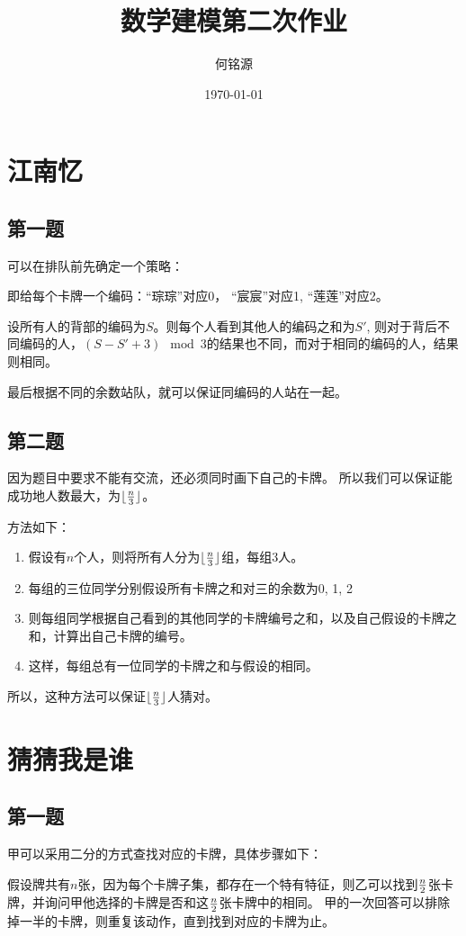 \documentclass{ctexart}
\author{何铭源}
\date{\today}
\title{数学建模第二次作业}
\begin{document}
\maketitle
\section{江南忆}
\subsection{第一题}
可以在排队前先确定一个策略：

即给每个卡牌一个编码：``琮琮''对应0， ``宸宸''对应1, ``莲莲''对应2。

设所有人的背部的编码为$S$。则每个人看到其他人的编码之和为$S'$, 则对于背后不同编码的人，$(S - S' + 3) \mod 3$的结果也不同，而对于相同的编码的人，结果则相同。

最后根据不同的余数站队，就可以保证同编码的人站在一起。
\subsection{第二题}
因为题目中要求不能有交流，还必须同时画下自己的卡牌。
所以我们可以保证能成功地人数最大，为$\lfloor {n \over 3} \rfloor$。

方法如下：
\begin{enumerate}
    \item 假设有$n$个人，则将所有人分为$\lfloor {n \over 3} \rfloor$组，每组3人。
    \item 每组的三位同学分别假设所有卡牌之和对三的余数为0, 1, 2
    \item 则每组同学根据自己看到的其他同学的卡牌编号之和，以及自己假设的卡牌之和，计算出自己卡牌的编号。
    \item 这样，每组总有一位同学的卡牌之和与假设的相同。
\end{enumerate}
所以，这种方法可以保证$\lfloor{ n \over 3} \rfloor$人猜对。
\section{猜猜我是谁}
\subsection{第一题}
甲可以采用二分的方式查找对应的卡牌，具体步骤如下：

假设牌共有$n$张，因为每个卡牌子集，都存在一个特有特征，则乙可以找到$n \over 2$张卡牌，并询问甲他选择的卡牌是否和这$n \over 2$张卡牌中的相同。
甲的一次回答可以排除掉一半的卡牌，则重复该动作，直到找到对应的卡牌为止。
\end{document}
